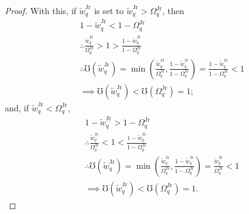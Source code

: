 \documentclass[hidelinks, nonatbib]{elsarticle}
\begin{document}
\begin{lemma}
\begin{proof}
        With this, if $\tilde{w}_{q}^{\text{Jr}}$ is set to $\tilde{w}_{q}^{\text{Jr}} > \Omega_{q}^{\text{Jr}}$, then
        \begin{align}
            &
            1 - \tilde{w}_{q}^{\text{Jr}}
            <
            1 - \Omega_{q}^{\text{Jr}}
            \\
            &\therefore
            \frac{
                \tilde{w}_{q}^{\text{Jr}}
            }{
                \Omega_{q}^{\text{Jr}}
            }
            >
            1
            >
            \frac{
                1 - \tilde{w}_{q}^{\text{Jr}}
            }{
                1 - \Omega_{q}^{\text{Jr}}
            }
            \\
            &\therefore
            \mho(\tilde{w}_{q}^{\text{Jr}}) 
            =
            \min\left(
                \frac{
                    \tilde{w}_{q}^{\text{Jr}}
                }{
                    \Omega_{q}^{\text{Jr}}
                }
                ,
                \frac{
                    1 - \tilde{w}_{q}^{\text{Jr}}
                }{
                    1 - \Omega_{q}^{\text{Jr}}
                }
            \right)
            =
            \frac{
                1 - \tilde{w}_{q}^{\text{Jr}}
            }{
                1 - \Omega_{q}^{\text{Jr}}
            }
            <
            1
            \\
            &\implies
            \mho(\tilde{w}_{q}^{\text{Jr}})
            <
            \mho(\Omega_{q}^{\text{Jr}})
            =
            1
            ;
        \end{align}
        and, if $\tilde{w}_{q}^{\text{Jr}} < \Omega_{q}^{\text{Jr}}$,
        \begin{align}
            &
            1 - \tilde{w}_{q}^{\text{Jr}}
            >
            1 - \Omega_{q}^{\text{Jr}}
            \\
            &\therefore
            \frac{
                \tilde{w}_{q}^{\text{Jr}}
            }{
                \Omega_{q}^{\text{Jr}}
            }
            <
            1
            <
            \frac{
                1 - \tilde{w}_{q}^{\text{Jr}}
            }{
                1 - \Omega_{q}^{\text{Jr}}
            }
            \\
            &\therefore
            \mho(\tilde{w}_{q}^{\text{Jr}}) 
            =
            \min\left(
                \frac{
                    \tilde{w}_{q}^{\text{Jr}}
                }{
                    \Omega_{q}^{\text{Jr}}
                }
                ,
                \frac{
                    1 - \tilde{w}_{q}^{\text{Jr}}
                }{
                    1 - \Omega_{q}^{\text{Jr}}
                }
            \right)
            =
            \frac{
                \tilde{w}_{q}^{\text{Jr}}
            }{
                \Omega_{q}^{\text{Jr}}
            }
            <
            1
            \\
            &\implies
            \mho(\tilde{w}_{q}^{\text{Jr}})
            <
            \mho(\Omega_{q}^{\text{Jr}})
            =
            1
            .
        \end{align}
        

\end{proof}
\end{lemma}
\end{document}
